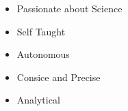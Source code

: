 %
%
%

\twocolumnsection
{
\begin{skills}
\end{skills}}
{
\vspace{1em}
\begin{itemize}
	\item Passionate about Science
	\item Self Taught                    
    	\item Autonomous
	\item Consice and Precise
	\item Analytical
\end{itemize}
}
